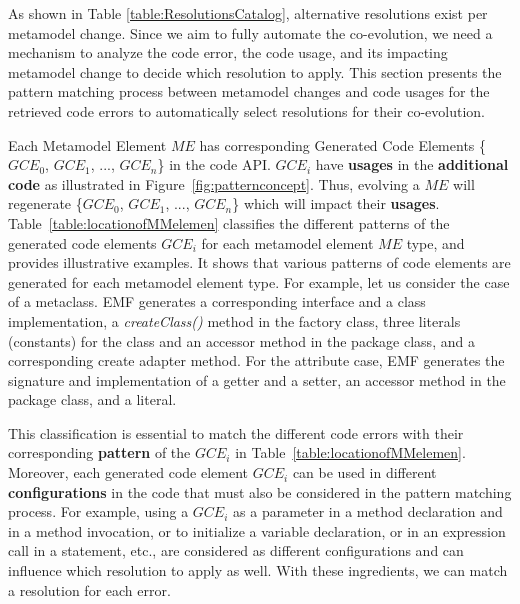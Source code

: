As shown in Table \ref{table:ResolutionsCatalog}, alternative resolutions exist per metamodel change. Since we aim to fully automate the co-evolution, we need a mechanism to analyze the code error, the code usage, and its impacting metamodel change to decide which resolution to apply. 
This section presents the pattern matching process between metamodel changes and code usages for the retrieved code errors to automatically select resolutions for their co-evolution.

Each Metamodel Element $ME$ has corresponding Generated Code Elements \{$GCE_0$, $GCE_1$, ..., $GCE_n$\} in the code API. 
$GCE_i$ have \textbf{usages} in the \textbf{additional code} as illustrated in Figure~\ref{fig:patternconcept}.
Thus, evolving a $ME$ will regenerate \{$GCE_0$, $GCE_1$, ..., $GCE_n$\} which will impact their \textbf{usages}. 
%
Table~\ref{table:locationofMMelemen} classifies the different patterns of the generated code elements $GCE_i$ for each metamodel element $ME$ type, and provides illustrative examples. It shows that various patterns of code elements are generated for each metamodel element type. %
For example, let us consider the case of a metaclass. EMF generates a corresponding interface and a class implementation, a \emph{createClass()} method in the factory class, three literals (\ie constants) for the class and an accessor method in the package class, and a corresponding create adapter method. For the attribute case, EMF generates the signature and implementation of a getter and a setter, an accessor method in the package class, and a literal. 

This classification is essential to match the different code errors with their corresponding \textbf{pattern} of the $GCE_i$ in Table~\ref{table:locationofMMelemen}. 
%
Moreover, each generated code element $GCE_i$ can be used in different \textbf{configurations} in the code that must also be considered in the pattern matching process. For example, using a $GCE_i$ as a parameter in a method declaration and in a method invocation, or to initialize a variable declaration, or in an expression call in a statement, etc., are considered as different configurations and can influence which resolution to apply as well. With these ingredients, we can match a resolution for each error. 

